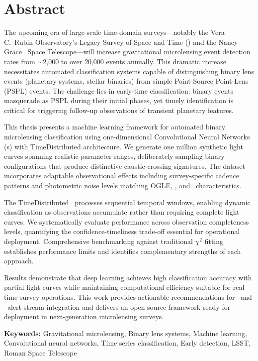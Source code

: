 
\cleardoublepage
\thispagestyle{empty}

\vspace*{50pt}

\section*{Abstract}

The upcoming era of large-scale time-domain surveys---notably the Vera C.~Rubin Observatory's Legacy Survey of Space and Time (\lsst) and the Nancy Grace \romantel\ Space Telescope---will increase gravitational microlensing event detection rates from $\sim$2,000 to over 20,000 events annually. This dramatic increase necessitates automated classification systems capable of distinguishing binary lens events (planetary systems, stellar binaries) from simple Point-Source Point-Lens (PSPL) events. The challenge lies in early-time classification: binary events masquerade as PSPL during their initial phases, yet timely identification is critical for triggering follow-up observations of transient planetary features.

This thesis presents a machine learning framework for automated binary microlensing classification using one-dimensional Convolutional Neural Networks (\cnn s) with TimeDistributed architecture. We generate one million synthetic light curves spanning realistic parameter ranges, deliberately sampling binary configurations that produce distinctive caustic-crossing signatures. The dataset incorporates adaptable observational effects including survey-specific cadence patterns and photometric noise levels matching OGLE, \lsst, and \romantel\ characteristics.

The TimeDistributed \cnn\ processes sequential temporal windows, enabling dynamic classification as observations accumulate rather than requiring complete light curves. We systematically evaluate performance across observation completeness levels, quantifying the confidence-timeliness trade-off essential for operational deployment. Comprehensive benchmarking against traditional $\chi^2$ fitting establishes performance limits and identifies complementary strengths of each approach.

Results demonstrate that deep learning achieves high classification accuracy with partial light curves while maintaining computational efficiency suitable for real-time survey operations. This work provides actionable recommendations for \lsst\ and \romantel\ alert stream integration and delivers an open-source framework ready for deployment in next-generation microlensing surveys.

\vspace{1cm}

\noindent\textbf{Keywords:} Gravitational microlensing, Binary lens systems, Machine learning, Convolutional neural networks, Time series classification, Early detection, LSST, Roman Space Telescope

\cleardoublepage

